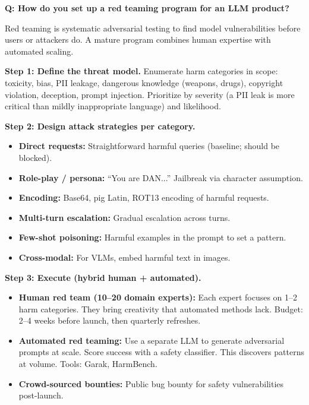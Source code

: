 \begin{interviewq}
\textbf{Q: How do you set up a red teaming program for an LLM product?}

 \quad {} \quad \badgefreq{\freqlow}

\stronganswer

Red teaming is systematic adversarial testing to find model vulnerabilities before users or attackers do. A mature program combines human expertise with automated scaling.

\textbf{Step 1: Define the threat model.} Enumerate harm categories in scope: toxicity, bias, PII leakage, dangerous knowledge (weapons, drugs), copyright violation, deception, prompt injection. Prioritize by severity (a PII leak is more critical than mildly inappropriate language) and likelihood.

\textbf{Step 2: Design attack strategies per category.}
\begin{itemize}
    \item \textbf{Direct requests:} Straightforward harmful queries (baseline; should be blocked).
    \item \textbf{Role-play / persona:} ``You are DAN...'' Jailbreak via character assumption.
    \item \textbf{Encoding:} Base64, pig Latin, ROT13 encoding of harmful requests.
    \item \textbf{Multi-turn escalation:} Gradual escalation across turns.
    \item \textbf{Few-shot poisoning:} Harmful examples in the prompt to set a pattern.
    \item \textbf{Cross-modal:} For VLMs, embed harmful text in images.
\end{itemize}

\textbf{Step 3: Execute (hybrid human + automated).}
\begin{itemize}
    \item \textbf{Human red team (10--20 domain experts):} Each expert focuses on 1--2 harm categories. They bring creativity that automated methods lack. Budget: 2--4 weeks before launch, then quarterly refreshes.
    \item \textbf{Automated red teaming:} Use a separate LLM to generate adversarial prompts at scale. Score success with a safety classifier. This discovers patterns at volume. Tools: Garak, HarmBench.
    \item \textbf{Crowd-sourced bounties:} Public bug bounty for safety vulnerabilities post-launch.
\end{itemize}


\end{interviewq}
